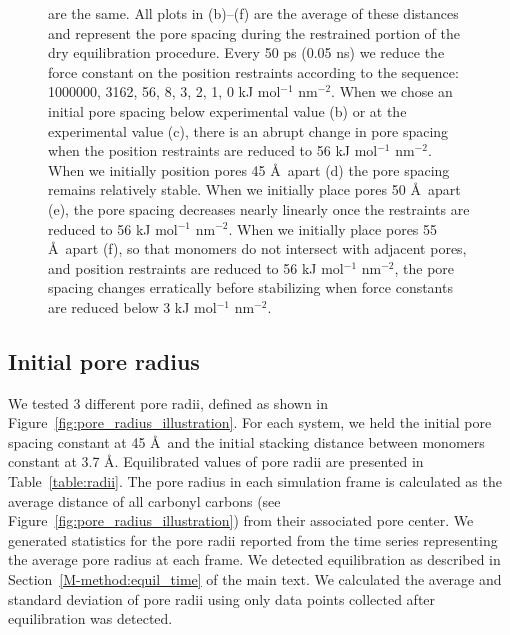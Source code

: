 \documentclass{article}
\begin{document}
\begin{figure}[!htb]
{	are the same. All plots in (b)--(f) are the average of these distances and represent
	the pore spacing during the restrained portion of the dry equilibration procedure.
	Every 50 ps (0.05 ns) we reduce the force constant on the position restraints according to the sequence: 1000000,
	3162, 56, 8, 3, 2, 1, 0 kJ mol$^{-1}$ nm$^{-2}$. When we chose an initial pore
	spacing below experimental value (b) or at the experimental value (c), there
	is an abrupt change in pore spacing when the position restraints are reduced to 56 kJ
	mol$^{-1}$ nm$^{-2}$. When we initially position pores 45 \AA~apart (d) the pore spacing
	remains relatively stable. When we initially place pores 50 \AA~apart (e), the pore
	spacing decreases nearly linearly once the restraints are reduced to 56 kJ
	mol$^{-1}$ nm$^{-2}$. When we initially place pores 55 \AA~apart (f), so that monomers
	do not intersect with adjacent pores, and position restraints are reduced to 56
	kJ mol$^{-1}$ nm$^{-2}$, the pore spacing changes erratically before stabilizing
	when force constants are reduced below 3 kJ mol$^{-1}$ nm$^{-2}$. } 
	\label{fig:p2p}
  \end{figure}

  \subsection{Initial pore radius}\label{section:initial_pore_radius}

  We tested 3 different pore radii, defined as shown in
  Figure~\ref{fig:pore_radius_illustration}. For each system, we held the initial
  pore spacing constant at 45 \AA~and the initial stacking distance between monomers
  constant at 3.7 \AA. Equilibrated values of pore radii are presented in
  Table~\ref{table:radii}. The pore radius in each simulation frame is calculated
  as the average distance of all carbonyl carbons (see
  Figure~\ref{fig:pore_radius_illustration}) from their associated pore center.
  We generated statistics for the pore radii reported from the time series
  representing the average pore radius at each frame. We detected equilibration
  as described in Section~\ref{M-method:equil_time} of the main text. We 
  calculated the average and standard deviation of pore radii using only data 
  points collected after equilibration was detected.
\end{document}
